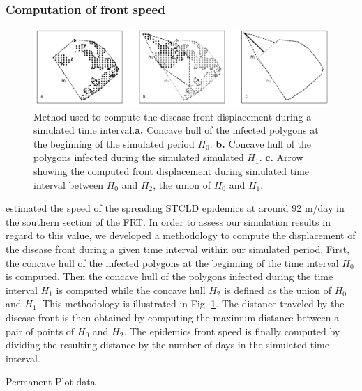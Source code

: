 \documentclass[utf8]{frontiersSCNS}
\begin{document}
\subsubsection{Computation of front speed}

\begin{figure}
    \centering
    \includegraphics[width=.99\linewidth]{figures/hull_example.png}
    \caption{Method used to compute the disease front displacement during a simulated time interval.\textbf{a.} Concave hull of the infected polygons at the beginning of the simulated period $H_0$. \textbf{b.} Concave hull of the polygons infected during the simulated simulated $H_1$. \textbf{c.} Arrow showing the computed front displacement during simulated time interval between $H_0$ and $H_2$, the union of $H_0$ and $H_1$.}
    \label{fig:hull}
\end{figure}

\cite{muller2020spatial} estimated the speed of the spreading STCLD epidemics at around 92 m/day in the southern section of the FRT. In order to assess our simulation results in regard to this value, we developed a methodology to compute the displacement of the disease front during a given time interval within our simulated period. First, the concave hull of the infected polygons at the beginning of the time interval $H_0$ is computed. Then the concave hull of the polygons infected during the time interval $H_1$ is computed while the concave hull $H_2$ is defined as the union of $H_0$ and $H_1$. This methodology is illustrated in Fig. \ref{fig:hull}. The distance traveled by the disease front is then obtained by computing the maximum distance between a pair of points of $H_0$ and $H_2$. The epidemics front speed is finally computed by dividing the resulting distance by the number of days in the simulated time interval.

Permanent Plot data
\end{document}
